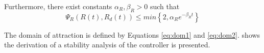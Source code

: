 Furthermore, there exist constants $ \alpha_R,\beta_R>0 $ such that
\begin{equation}\label{eq:con.PsiRconv}
\Psi_R(R(t),R_d(t)) \leq min\left\lbrace 2,\alpha_Re^{-\beta_Rt}\right\rbrace 
\end{equation}

The domain of attraction is defined by Equations \ref{eq:dom1} and \ref{eq:dom2}. \cite{Lee2010} shows the derivation of a stability analysis of the controller is presented. 






